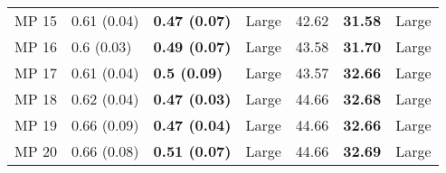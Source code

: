 \begin{tabular}{lllllll}
 MP 15 &       0.61 (0.04) &  \textbf{0.47 (0.07)} &       Large &                   42.62 &           \textbf{31.58} &       Large \\
 MP 16 &        0.6 (0.03) &  \textbf{0.49 (0.07)} &       Large &                   43.58 &           \textbf{31.70} &       Large \\
 MP 17 &       0.61 (0.04) &   \textbf{0.5 (0.09)} &       Large &                   43.57 &           \textbf{32.66} &       Large \\
 MP 18 &       0.62 (0.04) &  \textbf{0.47 (0.03)} &       Large &                   44.66 &           \textbf{32.68} &       Large \\
 MP 19 &       0.66 (0.09) &  \textbf{0.47 (0.04)} &       Large &                   44.66 &           \textbf{32.66} &       Large \\
 MP 20 &       0.66 (0.08) &  \textbf{0.51 (0.07)} &       Large &                   44.66 &           \textbf{32.69} &       Large \\
\bottomrule
\end{tabular}

